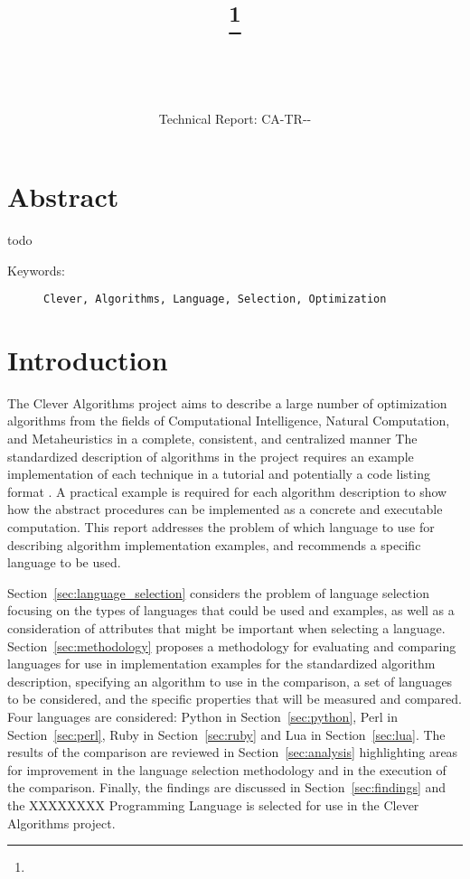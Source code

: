 \documentclass[a4paper, 11pt]{article}
\title{{\myreporttitle}\footnote{\myreportlicense}}
\author{\myreportauthor\\{\myreportemail}\\\small\myreportproject}
\date{\myreportfulldate\\{\small{Technical Report: CA-TR-{\myreportdate}-\myreportversion}}}
\begin{document}
\maketitle

\section*{Abstract} 
todo

\begin{description}
	\item[Keywords:] {\small\texttt{Clever, Algorithms, Language, Selection, Optimization}}
\end{description} 

\section{Introduction}
\label{sec:introduction}
The Clever Algorithms project aims to describe a large number of optimization algorithms from the fields of Computational Intelligence, Natural Computation, and Metaheuristics in a complete, consistent, and centralized manner \cite{Brownlee2010}
The standardized description of algorithms in the project requires an example implementation of each technique in a tutorial and potentially a code listing format \cite{Brownlee2010a}.
A practical example is required for each algorithm description to show how the abstract procedures can be implemented as a concrete and executable computation.
This report addresses the problem of which language to use for describing algorithm implementation examples, and recommends a specific language to be used.

Section~\ref{sec:language_selection} considers the problem of language selection focusing on the types of languages that could be used and examples, as well as a consideration of attributes that might be important when selecting a language.
Section~\ref{sec:methodology} proposes a methodology for evaluating and comparing languages for use in implementation examples for the standardized algorithm description, specifying an algorithm to use in the comparison, a set of languages to be considered, and the specific properties that will be measured and compared.
Four languages are considered: Python in Section~\ref{sec:python}, Perl in Section~\ref{sec:perl}, Ruby in Section~\ref{sec:ruby} and Lua in Section~\ref{sec:lua}.
The results of the comparison are reviewed in Section~\ref{sec:analysis} highlighting areas for improvement in the language selection methodology and in the execution of the comparison. 
Finally, the findings are discussed in Section~\ref{sec:findings} and the XXXXXXXX Programming Language is selected for use in the Clever Algorithms project.
\end{document}
